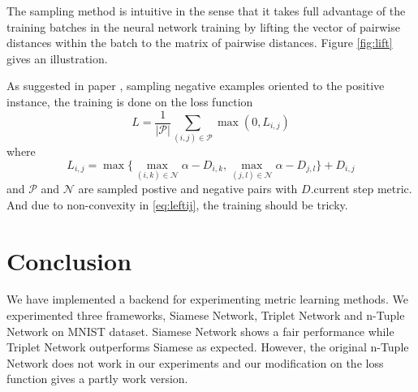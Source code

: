 \documentclass[10pt,twocolumn,letterpaper]{article}
\begin{document}
	The sampling method is intuitive in the sense that it takes full advantage of the training batches in the neural network training by lifting the vector of pairwise distances within the batch to the matrix of pairwise distances. Figure \ref{fig:lift} gives an illustration. 

	As suggested in paper \cite{lifted}, sampling negative examples oriented to the positive instance, the training is done on the loss function 
	\begin{equation}
		L=\frac{1}{|\mathcal{P}|}\sum_{(i,j)\in \mathcal{P}}\max(0, L_{i,j})
	\end{equation}
	where
	\begin{equation}
		L_{i,j}=\max\{\max_{(i,k)\in\mathcal{N}}\alpha-D_{i,k}, \max_{(j,l)\in\mathcal{N}}\alpha-D_{j,l}\}+D_{i,j}\label{eq:leftij}
	\end{equation}
	and $\mathcal{P}$ and $\mathcal{N}$ are sampled postive and negative pairs with $D$.current step metric. And due to non-convexity in \ref{eq:leftij}, the training should be tricky\cite{lifted}.
	\section{Conclusion \label{sec:Conc}}
		We have implemented a backend for experimenting metric learning methods. We experimented three frameworks, Siamese Network, Triplet Network and n-Tuple Network on MNIST dataset. Siamese Network shows a fair performance while Triplet Network outperforms Siamese as expected. However, the original n-Tuple Network does not work in our experiments and our modification on the loss function gives a partly work version.
	{\small
		
		
	}
	
\end{document}

